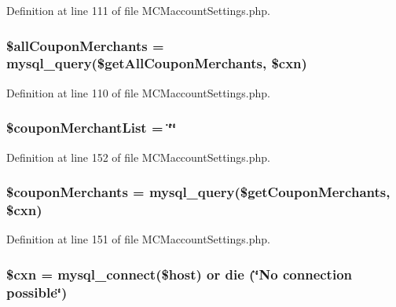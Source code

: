 Definition at line 111 of file M\-C\-Maccount\-Settings.\-php.

\hypertarget{_m_c_maccount_settings_8php_ac2b2cf021ba3f45382a7c009f4a85359}{
\subsubsection[{\$all\-Coupon\-Merchants}]{\setlength{\rightskip}{0pt plus 5cm}\$all\-Coupon\-Merchants = mysql\-\_\-query(\$get\-All\-Coupon\-Merchants, \$cxn)}}\label{_m_c_maccount_settings_8php_ac2b2cf021ba3f45382a7c009f4a85359}


Definition at line 110 of file M\-C\-Maccount\-Settings.\-php.

\hypertarget{_m_c_maccount_settings_8php_a773d789a200d6fa9d2b0342a5d6af9fd}{
\subsubsection[{\$coupon\-Merchant\-List}]{\setlength{\rightskip}{0pt plus 5cm}\$coupon\-Merchant\-List = \char`\"{}\char`\"{}}}\label{_m_c_maccount_settings_8php_a773d789a200d6fa9d2b0342a5d6af9fd}


Definition at line 152 of file M\-C\-Maccount\-Settings.\-php.

\hypertarget{_m_c_maccount_settings_8php_a3a32827acfafa83441c5161bcf7eceef}{
\subsubsection[{\$coupon\-Merchants}]{\setlength{\rightskip}{0pt plus 5cm}\$coupon\-Merchants = mysql\-\_\-query(\$get\-Coupon\-Merchants, \$cxn)}}\label{_m_c_maccount_settings_8php_a3a32827acfafa83441c5161bcf7eceef}


Definition at line 151 of file M\-C\-Maccount\-Settings.\-php.

\hypertarget{_m_c_maccount_settings_8php_afe14c5bdb9487c058ec831382f1fbacd}{
\subsubsection[{\$cxn}]{\setlength{\rightskip}{0pt plus 5cm}\$cxn = mysql\-\_\-connect(\$host) or die (\char`\"{}No connection possible\char`\"{})}}\label{_m_c_maccount_settings_8php_afe14c5bdb9487c058ec831382f1fbacd}


